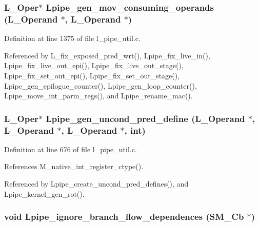\subsubsection{\setlength{\rightskip}{0pt plus 5cm}L\_\-Oper$\ast$ Lpipe\_\-gen\_\-mov\_\-consuming\_\-operands (L\_\-Operand $\ast$, L\_\-Operand $\ast$)}\label{l__pipe__util_8h_da3a3357b8fde887ab841682e5ee9151}




Definition at line 1375 of file l\_\-pipe\_\-util.c.

Referenced by L\_\-fix\_\-exposed\_\-pred\_\-wrt(), Lpipe\_\-fix\_\-live\_\-in(), Lpipe\_\-fix\_\-live\_\-out\_\-epi(), Lpipe\_\-fix\_\-live\_\-out\_\-stage(), Lpipe\_\-fix\_\-set\_\-out\_\-epi(), Lpipe\_\-fix\_\-set\_\-out\_\-stage(), Lpipe\_\-gen\_\-epilogue\_\-counter(), Lpipe\_\-gen\_\-loop\_\-counter(), Lpipe\_\-move\_\-int\_\-parm\_\-regs(), and Lpipe\_\-rename\_\-mac().
\subsubsection{\setlength{\rightskip}{0pt plus 5cm}L\_\-Oper$\ast$ Lpipe\_\-gen\_\-uncond\_\-pred\_\-define (L\_\-Operand $\ast$, L\_\-Operand $\ast$, L\_\-Operand $\ast$, int)}\label{l__pipe__util_8h_9df034fd9bbb4661af51542996abeacc}




Definition at line 676 of file l\_\-pipe\_\-util.c.

References M\_\-native\_\-int\_\-register\_\-ctype().

Referenced by Lpipe\_\-create\_\-uncond\_\-pred\_\-defines(), and Lpipe\_\-kernel\_\-gen\_\-rot().
\subsubsection{\setlength{\rightskip}{0pt plus 5cm}void Lpipe\_\-ignore\_\-branch\_\-flow\_\-dependences (\bf{SM\_\-Cb} $\ast$)}\label{l__pipe__util_8h_ed65ff86dd8fa993bda749213be99abf}


